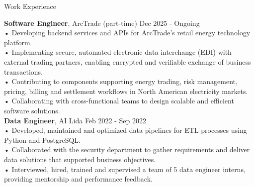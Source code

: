 \documentclass{resume} %
\begin{document}
\begin{rSection}{Work Experience}

{\bf Software Engineer}{, ArcTrade (part-time)} \hfill {Dec 2025 - Ongoing}\\
• Developing backend services and APIs for ArcTrade's retail energy technology platform.\\
• Implementing secure, automated electronic data interchange (EDI) with external trading partners, enabling encrypted and verifiable exchange of business transactions.\\
• Contributing to components supporting energy trading, risk management, pricing, billing and settlement workflows in North American electricity markets.\\
• Collaborating with cross-functional teams to design scalable and efficient software solutions.\\
{\bf Data Engineer}{, AI Lida} \hfill {Feb 2022 - Sep 2022}\\
• Developed, maintained and optimized data pipelines for ETL processes using Python and PostgreSQL.\\
• Collaborated with the security department to gather requirements and deliver data solutions that supported business objectives.\\
• Interviewed, hired, trained and supervised a team of 5 data engineer interns, providing mentorship and performance feedback.\\

\end{rSection}
\end{document}
